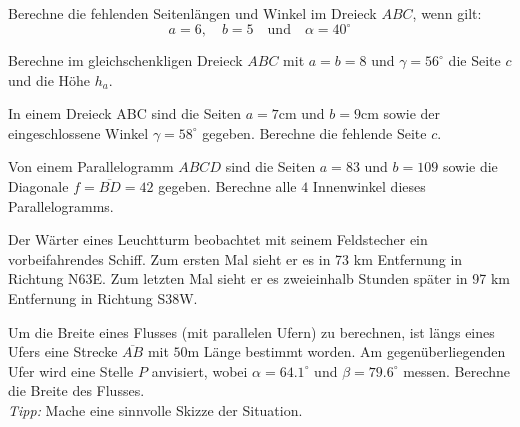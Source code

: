\documentclass[11pt]{exam}
\begin{document}
\begin{questions}
\question[3]
Berechne die fehlenden Seitenlängen und Winkel im Dreieck $ABC$, wenn gilt:
\[a=6,\quad b=5\quad\text{und}\quad\alpha=40^\circ\]


\question[2]
Berechne im gleichschenkligen Dreieck $ABC$ mit $a=b=8$ und $\gamma=56^\circ$ die Seite $c$ und die Höhe $h_a$.


\question[4]
In einem Dreieck ABC sind die Seiten $a=7$cm und $b=9$cm sowie der eingeschlossene Winkel $\gamma=58^\circ$ gegeben. Berechne die fehlende Seite $c$.


\question[3]
Von einem Parallelogramm $ABCD$ sind die Seiten $a=83$ und $b=109$ sowie die Diagonale $f=\overline{BD}=42$ gegeben. Berechne alle $4$ Innenwinkel dieses Parallelogramms.


\noaddpoints
\question[\totalpoints]
\addpoints
Der Wärter eines Leuchtturm beobachtet mit seinem Feldstecher ein vorbeifahrendes Schiff. Zum ersten Mal sieht er es in 73 km Entfernung in Richtung N63E. Zum letzten Mal sieht er es zweieinhalb Stunden später in 97 km Entfernung in Richtung S38W.


\question[5] %
Um die Breite eines Flusses (mit parallelen Ufern) zu berechnen, ist längs eines Ufers eine Strecke $\overline{AB}$ mit $50$m Länge bestimmt worden. Am gegenüberliegenden Ufer wird eine Stelle $P$ anvisiert, wobei $\alpha=64.1^\circ$ und $\beta=79.6^\circ$ messen. Berechne die Breite des Flusses.\\
\emph{Tipp:} Mache eine sinnvolle Skizze der Situation.



\end{questions}
\end{document}
